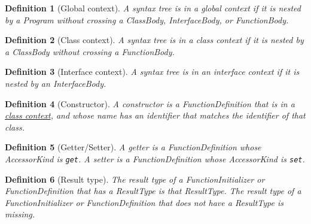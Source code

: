 \makeatletter{}\documentclass[10pt,oneside]{book}
\let\oldmarginpar\marginpar
\renewcommand\marginpar[1]{\-\oldmarginpar[\raggedleft\footnotesize #1]%
{\raggedright\footnotesize #1}}
\newcounter{parnum}[section]
\newcommand{\N}{\addtocounter{parnum}{1}\marginpar{\quad\arabic{chapter}.\arabic{section}(\arabic{parnum})}}
\newcommand{\nonterminal}[1]{{\slantsf #1}}
\newcommand{\terminal}[1]{{\tt #1}}
\theoremstyle{note}
\newtheorem{definition}{Definition}[section]
\begin{document}


\begin{definition}[Global context]\label{def:global-context}
A syntax tree is in a \emph{global context} if it is nested by a
\nonterminal{Program} without crossing
a \nonterminal{ClassBody}, \nonterminal{InterfaceBody}, or \nonterminal{FunctionBody}. 
\end{definition}

\begin{definition}[Class context]\label{def:class-context}
 A syntax tree is in a \emph{class context} if it is nested by a \nonterminal{ClassBody} without crossing
a \nonterminal{FunctionBody}. 
\end{definition}

\begin{definition}[Interface context]\label{def:interface-context}
 A syntax tree is in an \emph{interface context} if it is nested by an \nonterminal{InterfaceBody}. 
\end{definition}

\begin{definition}[Constructor]\label{def:constructor}
A \emph{constructor} is a \nonterminal{FunctionDefinition} that is in
a \hyperref[def:class-context]{class context}, and whose name has an identifier that matches the identifier
of that class.

\end{definition}

\begin{definition}[Getter/Setter]\label{def:getter-setter}
A \emph{getter} is a \nonterminal{FunctionDefinition} whose
\nonterminal{AccessorKind} is \terminal{get}. A \emph{setter} is a \nonterminal{FunctionDefinition} whose
\nonterminal{AccessorKind} is \terminal{set}.
\end{definition}

\begin{definition}[Result type]\label{def:result-type}
The \emph{result type} of a \nonterminal{FunctionInitializer} or \nonterminal{FunctionDefinition} that has
a \nonterminal{ResultType} is that \nonterminal{ResultType}. The
\emph{result type} of a \nonterminal{FunctionInitializer} or
\nonterminal{FunctionDefinition} that does not
have
a \nonterminal{ResultType} is missing.
\end{definition}
\end{document}
